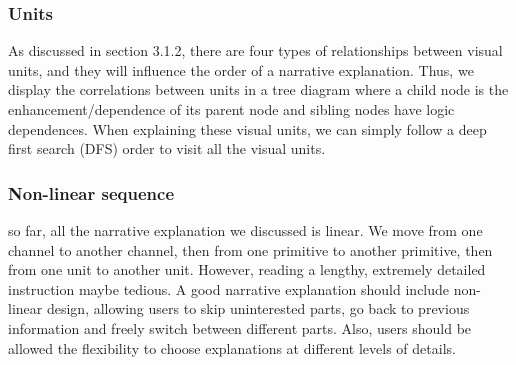 \subsubsection{Units} 
As discussed in section 3.1.2, there are four types of relationships between visual units, and they will influence the order of a narrative explanation. Thus, we display the correlations between units in a tree diagram where a child node is the enhancement/dependence of its parent node and sibling nodes have logic dependences. When explaining these visual units, we can simply follow a deep first search (DFS) order to visit all the visual units.

\subsubsection{Non-linear sequence}
so far, all the narrative explanation we discussed is linear. We move from one channel to another channel, then from one primitive to another primitive, then from one unit to another unit. However, reading a lengthy, extremely detailed instruction maybe tedious. A good narrative explanation should include non-linear design, allowing users to skip uninterested parts, go back to previous information and freely switch between different parts. Also, users should be allowed the flexibility to choose explanations at different levels of details. 
